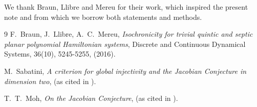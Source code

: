 \documentclass[11pt]{article}%
\theoremstyle{plain}
\theoremstyle{definition}
\begin{document}
We thank Braun, Llibre and Mereu for their work, which inspired the present
note and from which we borrow both statements and methods.

\begin{thebibliography}{9}                                                                                                %
F.~Braun, J.~Llibre, A.~C.~Mereu,
\newblock\emph{Isochronicity for trivial quintic and septic planar polynomial
Hamiltonian systems}, \newblock Discrete and Continuous Dynamical Systems,
36(10), 5245-5255, (2016).


M.~Sabatini, \newblock \emph{A criterion for global
injectivity and the Jacobian Conjecture in dimension two}, \newblock (as cited
in \cite{BraLliMer}).

T.~T.~Moh, \newblock\emph{On the Jacobian Conjecture},
\newblock(as cited in \cite{BraLliMer}).
\end{thebibliography}
\end{document}
